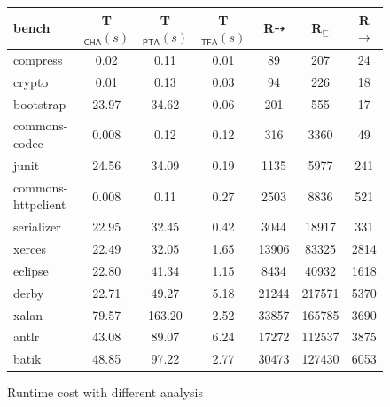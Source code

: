 \documentclass{llncs}
\newcommand{\less}{\sqsubseteq}
\newcommand{\tflow}{\dashrightarrow}
\begin{document}
\begin{figure}[t!]\centering
\begin{tabular}{lcccccc}
	\hline
	\textbf{bench} & \textbf{T$_{\textsf{CHA}}(s)$} & \textbf{T$_{\textsf{PTA}}(s)$} & \textbf{T$_{\textsf{TFA}}(s)$} & \hspace{2pt}\textbf{R${\tflow}$}\hspace{2pt} & \hspace{2pt}\textbf{R$_{\less}$}\hspace{2pt} & \hspace{2pt}\textbf{R${\rightarrow}$} \hspace{2pt}\\
	\hline
	compress & 0.02 & 0.11 & 0.01 & 89 & 207 & 24\\
	crypto & 0.01 & 0.13 & 0.03 & 94 & 226 & 18\\
	bootstrap & 23.97 & 34.62 & 0.06 & 201 & 555 & 17\\
	commons-codec & 0.008 & 0.12 & 0.12 & 316 & 3360 & 49\\
	junit & 24.56 & 34.09 & 0.19 & 1135 & 5977 & 241\\
	commons-httpclient & 0.008 & 0.11 & 0.27 & 2503 & 8836 & 521 \\
	serializer & 22.95 & 32.45 & 0.42 & 3044 & 18917 & 331\\
	xerces & 22.49 & 32.05 & 1.65 & 13906 & 83325 & 2814\\
	eclipse & 22.80 & 41.34 & 1.15 & 8434 & 40932 & 1618\\
	derby & 22.71 & 49.27 & 5.18 & 21244 & 217571 & 5370\\
	xalan & 79.57 & 163.20 & 2.52 & 33857 & 165785 & 3690\\
	antlr & 43.08 & 89.07 & 6.24 & 17272 & 112537 & 3875\\
	batik & 48.85 & 97.22 & 2.77 & 30473 & 127430 & 6053 \\
	\hline
\end{tabular}
\caption{Runtime cost with different analysis}
\label{experiment:TimeCost}
\end{figure}
\end{document}

